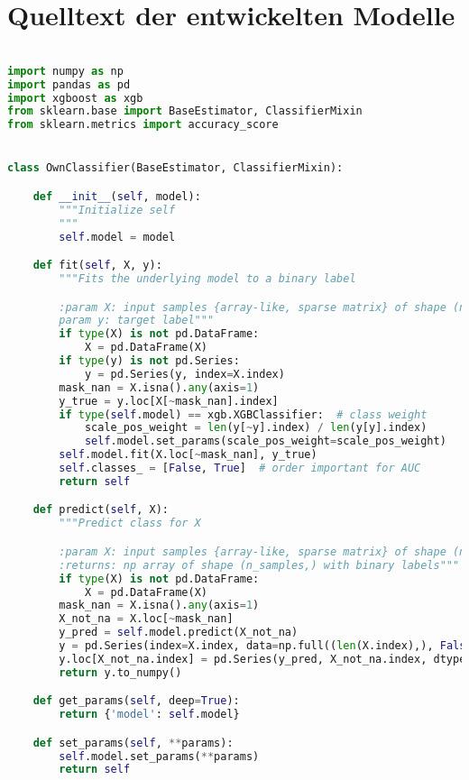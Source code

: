 \chapter{Quelltext der entwickelten Modelle}

\begin{lstlisting}[language=Python, basicstyle=\scriptsize, tabsize=4]

import numpy as np
import pandas as pd
import xgboost as xgb
from sklearn.base import BaseEstimator, ClassifierMixin
from sklearn.metrics import accuracy_score


class OwnClassifier(BaseEstimator, ClassifierMixin):

    def __init__(self, model):
        """Initialize self
        """
        self.model = model

    def fit(self, X, y):
        """Fits the underlying model to a binary label

        :param X: input samples {array-like, sparse matrix} of shape (n_samples, n_features}
        param y: target label"""
        if type(X) is not pd.DataFrame:
            X = pd.DataFrame(X)
        if type(y) is not pd.Series:
            y = pd.Series(y, index=X.index)
        mask_nan = X.isna().any(axis=1)
        y_true = y.loc[X[~mask_nan].index]
        if type(self.model) == xgb.XGBClassifier:  # class weight
            scale_pos_weight = len(y[~y].index) / len(y[y].index)
            self.model.set_params(scale_pos_weight=scale_pos_weight)
        self.model.fit(X.loc[~mask_nan], y_true)
        self.classes_ = [False, True]  # order important for AUC
        return self

    def predict(self, X):
        """Predict class for X

        :param X: input samples {array-like, sparse matrix} of shape (n_samples, n_features}
        :returns: np array of shape (n_samples,) with binary labels"""
        if type(X) is not pd.DataFrame:
            X = pd.DataFrame(X)
        mask_nan = X.isna().any(axis=1)
        X_not_na = X.loc[~mask_nan]
        y_pred = self.model.predict(X_not_na)
        y = pd.Series(index=X.index, data=np.full((len(X.index),), False), name='pred')
        y.loc[X_not_na.index] = pd.Series(y_pred, X_not_na.index, dtype=bool)
        return y.to_numpy()

    def get_params(self, deep=True):
        return {'model': self.model}

    def set_params(self, **params):
        self.model.set_params(**params)
        return self


\end{lstlisting}
